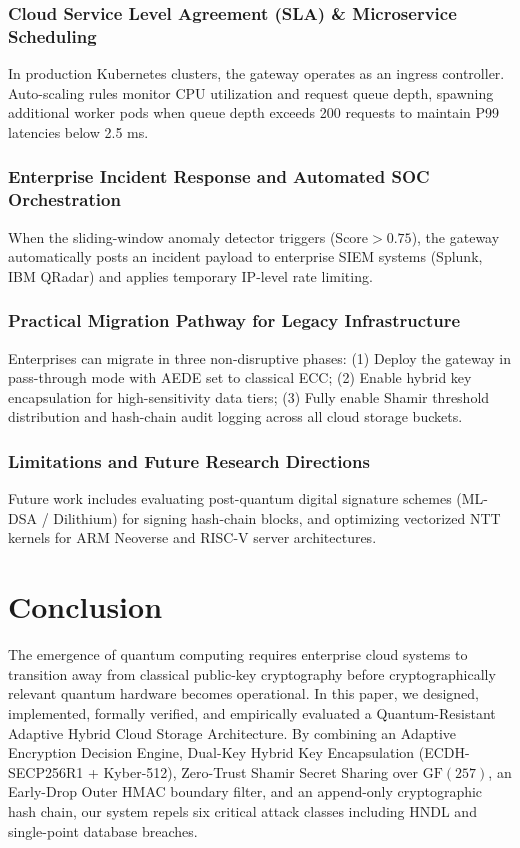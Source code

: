 \documentclass[5p,times]{elsarticle}
\begin{document}
\subsubsection{Cloud Service Level Agreement (SLA) \& Microservice Scheduling}

In production Kubernetes clusters, the gateway operates as an ingress controller. Auto-scaling rules monitor CPU utilization and request queue depth, spawning additional worker pods when queue depth exceeds 200 requests to maintain P99 latencies below 2.5 ms.


\subsubsection{Enterprise Incident Response and Automated SOC Orchestration}

When the sliding-window anomaly detector triggers ($\text{Score} > 0.75$), the gateway automatically posts an incident payload to enterprise SIEM systems (Splunk, IBM QRadar) and applies temporary IP-level rate limiting.


\subsubsection{Practical Migration Pathway for Legacy Infrastructure}

Enterprises can migrate in three non-disruptive phases: (1) Deploy the gateway in pass-through mode with AEDE set to classical ECC; (2) Enable hybrid key encapsulation for high-sensitivity data tiers; (3) Fully enable Shamir threshold distribution and hash-chain audit logging across all cloud storage buckets.


\subsubsection{Limitations and Future Research Directions}

Future work includes evaluating post-quantum digital signature schemes (ML-DSA / Dilithium) for signing hash-chain blocks, and optimizing vectorized NTT kernels for ARM Neoverse and RISC-V server architectures.


\FloatBarrier
\section{Conclusion}

The emergence of quantum computing requires enterprise cloud systems to transition away from classical public-key cryptography before cryptographically relevant quantum hardware becomes operational. In this paper, we designed, implemented, formally verified, and empirically evaluated a Quantum-Resistant Adaptive Hybrid Cloud Storage Architecture. By combining an Adaptive Encryption Decision Engine, Dual-Key Hybrid Key Encapsulation (ECDH-SECP256R1 + Kyber-512), Zero-Trust Shamir Secret Sharing over $\text{GF}(257)$, an Early-Drop Outer HMAC boundary filter, and an append-only cryptographic hash chain, our system repels six critical attack classes including HNDL and single-point database breaches.
\end{document}
